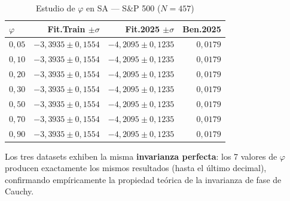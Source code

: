 \documentclass[12pt,a4paper]{article}
\begin{document}
\begin{table}[H]
\centering\footnotesize
\caption{Estudio de $\varphi$ en SA --- S\&P 500 ($N=457$)}
\begin{tabular}{lrrr}
\toprule
$\varphi$ & \textbf{Fit.Train} $\pm\sigma$ & \textbf{Fit.2025} $\pm\sigma$ & \textbf{Ben.2025} \\
\midrule
$0{,}05$ & $-3{,}3935 \pm 0{,}1554$ & $-4{,}2095 \pm 0{,}1235$ & $0{,}0179$ \\
$0{,}10$ & $-3{,}3935 \pm 0{,}1554$ & $-4{,}2095 \pm 0{,}1235$ & $0{,}0179$ \\
$0{,}20$ & $-3{,}3935 \pm 0{,}1554$ & $-4{,}2095 \pm 0{,}1235$ & $0{,}0179$ \\
$0{,}30$ & $-3{,}3935 \pm 0{,}1554$ & $-4{,}2095 \pm 0{,}1235$ & $0{,}0179$ \\
$0{,}50$ & $-3{,}3935 \pm 0{,}1554$ & $-4{,}2095 \pm 0{,}1235$ & $0{,}0179$ \\
$0{,}70$ & $-3{,}3935 \pm 0{,}1554$ & $-4{,}2095 \pm 0{,}1235$ & $0{,}0179$ \\
$0{,}90$ & $-3{,}3935 \pm 0{,}1554$ & $-4{,}2095 \pm 0{,}1235$ & $0{,}0179$ \\
\bottomrule
\end{tabular}
\end{table}

Los tres datasets exhiben la misma \textbf{invarianza perfecta}: los 7 valores de $\varphi$
producen exactamente los mismos resultados (hasta el último decimal), confirmando
empíricamente la propiedad teórica de la invarianza de fase de Cauchy.
\end{document}

